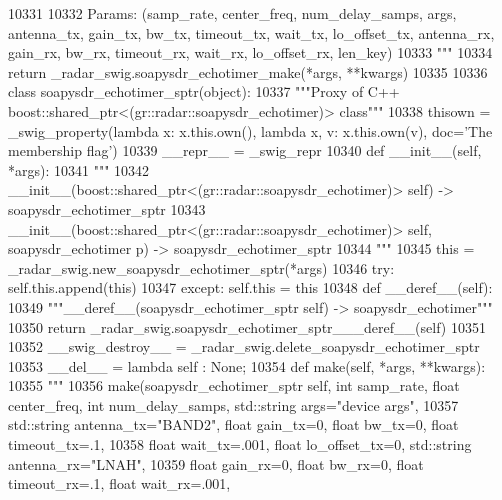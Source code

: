 \begin{DoxyCode}
{{{{{{{{{{{{{{{{{{{{{{{{{{{{{{{{{10331 \textcolor{stringliteral}{}
10332 \textcolor{stringliteral}{    Params: (samp\_rate, center\_freq, num\_delay\_samps, args, antenna\_tx, gain\_tx, bw\_tx, timeout\_tx,
       wait\_tx, lo\_offset\_tx, antenna\_rx, gain\_rx, bw\_rx, timeout\_rx, wait\_rx, lo\_offset\_rx, len\_key)}
10333 \textcolor{stringliteral}{    """}
10334   \textcolor{keywordflow}{return} \_radar\_swig.soapysdr\_echotimer\_make(*args, **kwargs)
10335 
10336 \textcolor{keyword}{class }soapysdr_echotimer_sptr(object):
10337     \textcolor{stringliteral}{"""Proxy of C++ boost::shared\_ptr<(gr::radar::soapysdr\_echotimer)> class"""}
10338     thisown = _swig_property(\textcolor{keyword}{lambda} x: x.this.own(), \textcolor{keyword}{lambda} x, v: x.this.own(v), doc=\textcolor{stringliteral}{'The membership flag'})
10339     \_\_repr\_\_ = \_swig\_repr
10340     \textcolor{keyword}{def }__init__(self, *args): 
10341         \textcolor{stringliteral}{"""}
10342 \textcolor{stringliteral}{        \_\_init\_\_(boost::shared\_ptr<(gr::radar::soapysdr\_echotimer)> self) -> soapysdr\_echotimer\_sptr}
10343 \textcolor{stringliteral}{        \_\_init\_\_(boost::shared\_ptr<(gr::radar::soapysdr\_echotimer)> self, soapysdr\_echotimer p) ->
       soapysdr\_echotimer\_sptr}
10344 \textcolor{stringliteral}{        """}
10345         this = \_radar\_swig.new\_soapysdr\_echotimer\_sptr(*args)
10346         \textcolor{keywordflow}{try}: self.this.append(this)
10347         \textcolor{keywordflow}{except}: self.this = this
10348     \textcolor{keyword}{def }__deref__(self):
10349         \textcolor{stringliteral}{"""\_\_deref\_\_(soapysdr\_echotimer\_sptr self) -> soapysdr\_echotimer"""}
10350         \textcolor{keywordflow}{return} \_radar\_swig.soapysdr\_echotimer\_sptr\_\_\_deref\_\_(self)
10351 
10352     \_\_swig\_destroy\_\_ = \_radar\_swig.delete\_soapysdr\_echotimer\_sptr
10353     \_\_del\_\_ = \textcolor{keyword}{lambda} self : \textcolor{keywordtype}{None};
10354     \textcolor{keyword}{def }make(self, *args, **kwargs):
10355         \textcolor{stringliteral}{"""}
10356 \textcolor{stringliteral}{        make(soapysdr\_echotimer\_sptr self, int samp\_rate, float center\_freq, int num\_delay\_samps,
       std::string args="device args", }
10357 \textcolor{stringliteral}{            std::string antenna\_tx="BAND2", float gain\_tx=0, float bw\_tx=0, float timeout\_tx=.1, }
10358 \textcolor{stringliteral}{            float wait\_tx=.001, float lo\_offset\_tx=0, std::string antenna\_rx="LNAH", }
10359 \textcolor{stringliteral}{            float gain\_rx=0, float bw\_rx=0, float timeout\_rx=.1, float wait\_rx=.001, }
}}}}}}}}}}}}}}}}}}}}}}}}}}}}}}}}}
\end{DoxyCode}
